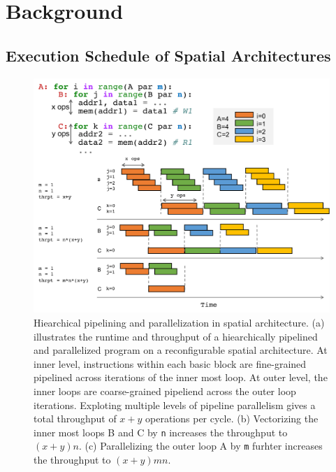 \chapter{Background}

\section{Execution Schedule of Spatial Architectures} 
\begin{figure}
\centering
\includegraphics[width=1.0\textwidth]{figs/pipeexec.pdf}
\caption[Hiearchical pipelining and parallelization on spatial architecture]{
Hiearchical pipelining and parallelization in spatial architecture.
(a) illustrates the runtime and throughput of a hiearchically pipelined and parallelized program on
a reconfigurable spatial architecture. 
At inner level, instructions within each basic
block are fine-grained pipelined across iterations of the inner most loop. 
At outer level, the inner loops are coarse-grained pipeliend across the outer loop iterations.
Exploting multiple levels of pipeline parallelism gives a total throughput of $x+y$ operations per cycle.
(b) Vectorizing the inner most loops B and C by \texttt{n} increases the throughput to $(x+y)n$.
(c) Parallelizing the outer loop A by \texttt{m} furhter increases the throughput to $(x+y)mn$.
}
\label{fig:pipeexec}

\end{figure}
